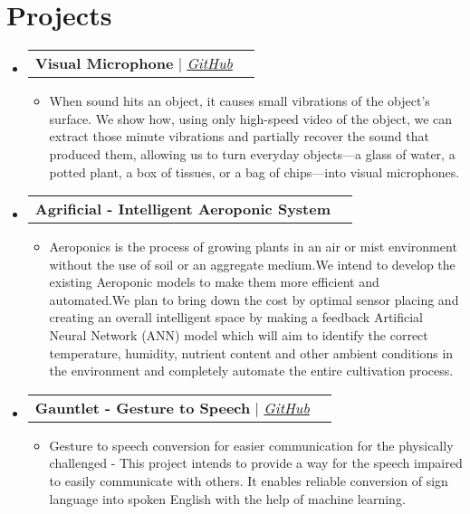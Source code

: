 \documentclass[letterpaper,11pt]{article}
\makeatletter
\newcommand{\resumeItem}[1]{
  \item\small{
    {#1 \vspace{-2pt}}
  }
}
\newcommand{\resumeProjectHeading}[2]{
    \vspace{-2pt}\item
    \begin{tabular*}{0.97\textwidth}{l@{\extracolsep{\fill}}r}
      \small#1 & #2 \\
    \end{tabular*}\vspace{-7pt}
}
\newcommand{\resumeSubHeadingListStart}{\begin{itemize}[leftmargin=0.15in, label={}]}
\newcommand{\resumeSubHeadingListEnd}{\end{itemize}}
\newcommand{\resumeItemListStart}{\begin{itemize}}
\newcommand{\resumeItemListEnd}{\end{itemize}\vspace{-5pt}}
\makeatother
\begin{document}



\section{Projects}
    \vspace{3pt}
    \resumeSubHeadingListStart

      \resumeProjectHeading
        {\textbf{Visual Microphone} $|$ \emph{\href{https://github.com/mkparihar/Visual_Mic}{\color{blue}GitHub}}}{}
          \resumeItemListStart
            \resumeItem{When sound hits an object, it causes small vibrations of the object’s surface. We show how, using only high-speed video of the object, we can extract those minute vibrations and partially recover the sound that produced them, allowing us to turn everyday objects—a glass of water, a potted plant, a box of tissues, or a bag of chips—into visual microphones.}
          \resumeItemListEnd

      \resumeProjectHeading
        {\textbf{Agrificial - Intelligent Aeroponic System}}{}
          \resumeItemListStart
            \resumeItem{Aeroponics is the process of growing plants in an air or mist environment without the use of soil or an aggregate medium.We intend to develop the existing Aeroponic models to make them more efficient and automated.We plan to bring down the cost by optimal sensor placing and creating an overall intelligent space by making a feedback Artificial Neural Network (ANN) model which will aim to identify the correct temperature, humidity, nutrient content and other ambient conditions in the environment and completely automate the entire cultivation process.}
          \resumeItemListEnd

      \resumeProjectHeading
        {\textbf{Gauntlet - Gesture to Speech} $|$ \emph{\href{https://github.com/mkparihar/Gauntlet}{\color{blue}GitHub}}}{}
          \resumeItemListStart
            \resumeItem{Gesture to speech conversion for easier communication for the physically challenged - This project intends to provide a way for the speech impaired to easily communicate with others. It enables reliable conversion of sign language into spoken English with the help of machine learning.}
          \resumeItemListEnd

    \resumeSubHeadingListEnd



\end{document}
